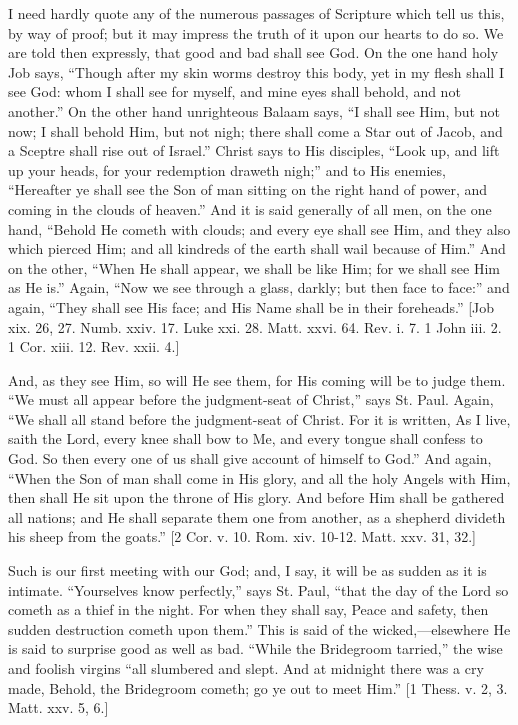I need hardly quote any of the numerous passages of Scripture which
tell us this, by way of proof; but it may impress the truth of it upon
our hearts to do so. We are told then expressly, that good and bad
shall see God. On the one hand holy Job says, ``Though after my
skin worms destroy this body, yet in my flesh shall I see God: whom I
shall see for myself, and mine eyes shall behold, and not
another.'' On the other hand unrighteous Balaam says, ``I
shall see Him, but not now; I shall behold Him, but not nigh; there
shall come a Star out of Jacob, and a Sceptre shall rise out of
Israel.'' Christ says to His disciples, ``Look up, and lift up
your heads, for your redemption draweth nigh;'' and to His
enemies, ``Hereafter ye shall see the Son of man sitting on the
right hand of power, and coming in the clouds of heaven.'' And it
is said generally of all men, on the one hand, ``Behold He cometh with
clouds; and every eye shall see Him, and they also which pierced Him;
and all kindreds of the earth shall wail because of Him.'' And on
the other, ``When He shall appear, we shall be like Him; for we
shall see Him as He is.'' Again, ``Now we see through a glass,
darkly; but then face to face:'' and again, ``They shall see
His face; and His Name shall be in their foreheads.'' [Job xix.
26, 27. Numb. xxiv. 17. Luke xxi. 28. Matt. xxvi. 64. Rev. i. 7. 1
John iii. 2. 1 Cor. xiii. 12. Rev. xxii. 4.]

And, as they see Him, so will He see them, for His coming will be
to judge them. ``We must all appear before the judgment-seat of
Christ,'' says St. Paul. Again, ``We shall all stand before
the judgment-seat of Christ. For it is written, As I live, saith the
Lord, every knee shall bow to Me, and every tongue shall confess to
God. So then every one of us shall give account of himself to
God.'' And again, ``When the Son of man shall come in His
glory, and all the holy Angels with Him, then shall He sit upon the
throne of His glory. And before Him shall be gathered all nations; and
He shall separate them one from another, as a shepherd divideth his
sheep from the goats.'' [2 Cor. v. 10. Rom. xiv. 10-12. Matt. xxv.
31, 32.]

Such is our first meeting with our God; and, I say, it will be as
sudden as it is intimate. ``Yourselves know perfectly,'' says
St. Paul, ``that the day of the Lord so cometh as a thief in the
night. For when they shall say, Peace and safety, then sudden
destruction cometh upon them.'' This is said of the wicked,—elsewhere
He is said to surprise good as well as bad. ``While the Bridegroom
tarried,'' the wise and foolish virgins ``all slumbered and
slept. And at midnight there was a cry made, Behold, the Bridegroom
cometh; go ye out to meet Him.'' [1 Thess. v. 2, 3. Matt. xxv. 5,
6.]

